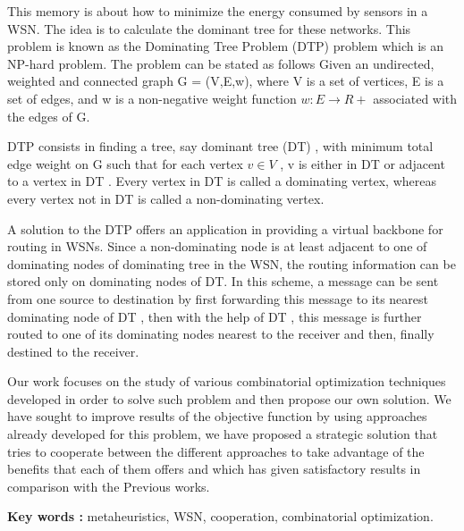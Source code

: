 \small 

This memory is about how to minimize the energy consumed by sensors in a WSN. The idea is to calculate the dominant tree for these networks. This problem is known as the Dominating Tree Problem (DTP) problem which is an NP-hard problem. The problem can be stated as follows Given an undirected, weighted and connected graph G = (V,E,w), where V is a set of vertices, E is a set of edges, and w is a non-negative weight function $w : E \to R+$ associated with the edges of G.

DTP consists in finding a tree, say dominant tree (DT) , with minimum total edge weight on G such that for each vertex  $v \in V$ , v is either in DT or adjacent to a vertex in DT . Every vertex in DT is called a dominating vertex, whereas every vertex not in DT is called a non-dominating vertex.

A solution to the DTP offers an application in providing a virtual backbone for routing in WSNs. Since a non-dominating node is at least adjacent to one of dominating nodes of dominating tree in the WSN, the routing information can be stored only on dominating nodes of DT. In this scheme, a message can be sent from one source to destination by first forwarding this message to its nearest dominating node of DT , then with the help of DT , this message is further routed to one of its dominating nodes nearest to the receiver and then, finally destined to the receiver. 

Our work focuses on the study of various combinatorial optimization techniques developed in order to solve such problem and then propose our own solution. We have sought to improve results of the objective function by using approaches already developed for this problem, we have proposed a strategic solution that tries to cooperate between the different approaches to take advantage of the benefits that each of them offers and which has given satisfactory results in comparison with the Previous works.\\


\vspace*{0.3cm}

\large
\textbf{Key words : }metaheuristics, WSN, cooperation, combinatorial optimization.

\normalsize
